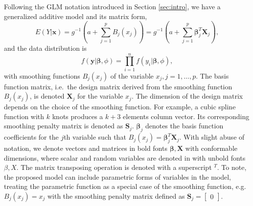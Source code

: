 \documentclass[AMA,STIX1COL,]{WileyNJD-v2}
\begin{document}
Following the GLM notation introduced in Section \ref{sec:intro}, we
have a generalized additive model and its matrix form,
\begin{equation}\label{eq:gam}
E(Y|\boldsymbol{x}) = g^{-1}(a + \sum\limits^p_{j=1}B_j(x_j)) = g^{-1}(a + \sum\limits^p_{j=1} \boldsymbol{\beta}_j^T \boldsymbol{X}_j),
\end{equation} and the data distribution is \begin{equation}
f(\boldsymbol{y}| \boldsymbol{\beta}, \phi) = \prod\limits^n_{i=1}f(y_i|\boldsymbol{\beta}, \phi),\nonumber
\end{equation} with smoothing functions \(B_j(x_j)\) of the variable
\(x_j, j = 1, \dots, p.\) The basis function matrix, i.e.~the design
matrix derived from the smoothing function \(B_j(x_j)\), is denoted
\(\boldsymbol{X}_j\) for the variable \(x_j\). The dimension of the
design matrix depends on the choice of the smoothing function. For
example, a cubic spline function with \(k\) knots produces a \(k+3\)
elements column vector. Its corresponding smoothing penalty matrix is
denoted as \(\boldsymbol{S}_j\). \(\boldsymbol{\beta}_j\) denotes the
basis function coefficients for the \(j\)th variable such that
\(B_j(x_j) = \boldsymbol{\beta}_j^T \boldsymbol{X}_j\). With slight
abuse of notation, we denote vectors and matrices in bold fonts
\(\boldsymbol{\beta}, \boldsymbol{X}\) with conformable dimensions,
where scalar and random variables are denoted in with unbold fonts
\(\beta, X\). The matrix transposing operation is denoted with a
superscript \(^T\). To note, the proposed model can include parametric
forms of variables in the model, treating the parametric function as a
special case of the smoothing function, e.g.~\(B_j(x_j) = x_j\) with the
smoothing penalty matrix defined as
\(\boldsymbol{S}_j = \begin{bmatrix}0\end{bmatrix}\).
\end{document}
